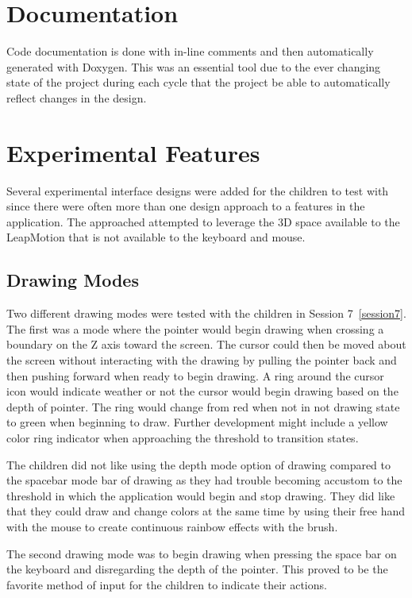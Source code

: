 \section{Documentation}

Code documentation is done with in-line comments and then automatically generated with Doxygen. This was an essential tool due to the ever changing state of the project during each cycle that the project be able to automatically reflect changes in the design. 

\section{Experimental Features}
Several experimental interface designs were added for the children to test with since there were often more than one design approach to a features in the application. The approached attempted to leverage the 3D space available to the LeapMotion that is not available to the keyboard and mouse. 
\subsection{Drawing Modes}

Two different drawing modes were tested with the children in Session 7~\ref{session7}. The first was a mode where the pointer would begin drawing when crossing a boundary on the Z axis toward the screen. The cursor could then be moved about the screen without interacting with the drawing by pulling the pointer back and then pushing forward when ready to begin drawing. A ring around the cursor icon would indicate weather or not the cursor would begin drawing based on the depth of pointer. The ring would change from red when not in not drawing state to green when beginning to draw. Further development might include a yellow color ring indicator when approaching the threshold to transition states. 

The children did not like using the depth mode option of drawing compared to the spacebar mode bar of drawing  as they had trouble becoming accustom to the threshold in which the application would begin and stop drawing. They did like that they could draw and change colors at the same time by using their free hand with the mouse to create continuous rainbow effects with the brush.  

The second drawing mode was to begin drawing when pressing the space bar on the keyboard and disregarding the depth of the pointer. This proved to be the favorite method of input for the children to indicate their actions. 

